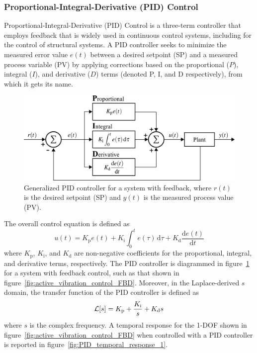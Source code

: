 \documentclass[12pt,letter]{article}
\begin{document}
\subsubsection{Proportional-Integral-Derivative (PID) Control}

Proportional-Integral-Derivative (PID) Control is a three-term controller that employs feedback that is widely used in continuous control systems, including for the control of structural systems. A PID controller seeks to minimize the measured error value $e(t)$ between a desired setpoint (SP) and a measured process variable (PV) by applying corrections based on the proportional ($P$), integral ($I$), and derivative ($D$) terms (denoted P, I, and D respectively), from which it gets its name.

\begin{figure}[H]
	\centering
	\includegraphics[]{../figures/PID_controller.png}
	\caption{Generalized PID controller for a system with feedback, where $r(t)$ is the desired setpoint (SP) and $y(t)$ is the measured process value (PV).}
	\label{fig:PID_controller}
\end{figure}

The overall control equation is defined as
\begin{equation}
	u(t) = K_\text{p} e(t) + K_\text{i} \int_0^t e(\tau) \,\mathrm{d}\tau + K_\text{d} \frac{\mathrm{d}e(t)}{\mathrm{d}t}
\end{equation}
where $K_\text{p}$, $K_\text{i}$, and $K_\text{d}$ are non-negative coefficients for the proportional, integral, and derivative terms, respectively. The PID controller is diagrammed in figure~\ref{fig:PID_controller} for a system with feedback control, such as that shown in figure~\ref{fig:active_vibration_control_FBD}. Moreover, in the Laplace-derived $s$ domain, the transfer function of the PID controller is defined as
\begin{equation}
	\mathcal{L}{\left[s\right]} = K_\text{p} + \frac{K_\text{i}}{s} + K_\text{d}s
\end{equation}
where $s$ is the complex frequency. A temporal response for the 1-DOF shown in figure~\ref{fig:active_vibration_control_FBD} when controlled with a PID controller is reported in figure~\ref{fig:PID_temporal_response_1}.
\end{document}
